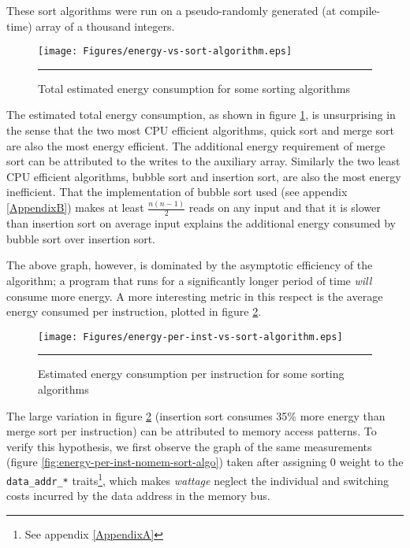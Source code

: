 These sort algorithms were run on a pseudo-randomly generated (at
compile-time) array of a thousand integers.

\begin{figure}[htbp]
  \centering
  \texttt{[image: Figures/energy-vs-sort-algorithm.eps]}
  \rule{35em}{0.5pt}
  \caption{Total estimated energy consumption for some sorting algorithms}
  \label{fig:total-energy-sort-algo}
\end{figure}

The estimated total energy consumption, as shown in figure
\ref{fig:total-energy-sort-algo}, is unsurprising in the sense that
the two most CPU efficient algorithms, quick sort and merge sort are
also the most energy efficient.  The additional energy requirement of
merge sort can be attributed to the writes to the auxiliary array.
Similarly the two least CPU efficient algorithms, bubble sort and
insertion sort, are also the most energy inefficient.  That the
implementation of bubble sort used (see appendix \ref{AppendixB})
makes at least $\frac{n (n - 1)}{2}$ reads on any input and that it is
slower than insertion sort on average input explains the additional
energy consumed by bubble sort over insertion sort.

The above graph, however, is dominated by the asymptotic efficiency of
the algorithm; a program that runs for a significantly longer period
of time \textit{will} consume more energy.  A more interesting metric
in this respect is the average energy consumed per instruction,
plotted in figure \ref{fig:energy-per-inst-sort-algo}.

\begin{figure}[htbp]
  \centering
  \texttt{[image: Figures/energy-per-inst-vs-sort-algorithm.eps]}
  \rule{35em}{0.5pt}
  \caption{Estimated energy consumption per instruction for some sorting algorithms}
  \label{fig:energy-per-inst-sort-algo}
\end{figure}

The large variation in figure \ref{fig:energy-per-inst-sort-algo}
(insertion sort consumes 35\% more energy than merge sort per
instruction) can be attributed to memory access patterns.  To verify
this hypothesis, we first observe the graph of the same measurements
(figure \ref{fig:energy-per-inst-nomem-sort-algo}) taken after
assigning 0 weight to the \texttt{data\_addr\_*} traits\footnote{See
  appendix \ref{AppendixA}}, which makes \textit{wattage} neglect the
individual and switching costs incurred by the data address in the
memory bus.

